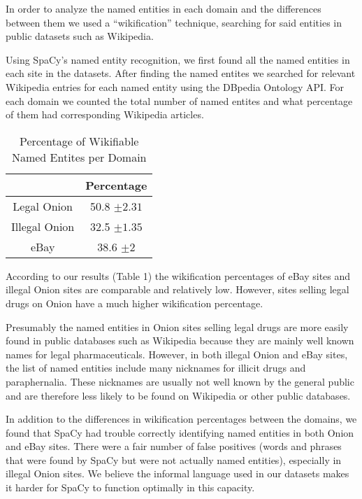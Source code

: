 \documentclass[11pt,a4paper]{article}
\begin{document}
In order to analyze the named entities in each domain and the differences
between them we used a ``wikification'' technique, searching for
said entities in public datasets such as Wikipedia. 

Using SpaCy's named entity recognition, we first found all the named
entities in each site in the datasets. After finding the named entites
we searched for relevant Wikipedia entries for each named entity using
the DBpedia Ontology API. For each domain we counted the total number
of named entites and what percentage of them had corresponding Wikipedia
articles.

\begin{table}

\caption{Percentage of Wikifiable Named Entites per Domain}

\begin{centering}
\begin{tabular}{|c||c|}
\hline 
 & Percentage\tabularnewline
\hline 
\hline 
Legal Onion & 50.8 $\pm2.31$\tabularnewline
\hline 
\hline 
Illegal Onion & 32.5 $\pm1.35$\tabularnewline
\hline 
\hline 
eBay & 38.6 $\pm2$\tabularnewline
\hline 
\end{tabular}
\par\end{centering}
\end{table}
According to our results (Table 1) the wikification percentages of
eBay sites and illegal Onion sites are comparable and relatively low.
However, sites selling legal drugs on Onion have a much higher wikification
percentage.

Presumably the named entities in Onion sites selling legal drugs are
more easily found in public databases such as Wikipedia because they
are mainly well known names for legal pharmaceuticals. However, in
both illegal Onion and eBay sites, the list of named entities include
many nicknames for illicit drugs and paraphernalia. These nicknames
are usually not well known by the general public and are therefore
less likely to be found on Wikipedia or other public databases.

In addition to the differences in wikification percentages between
the domains, we found that SpaCy had trouble correctly identifying
named entities in both Onion and eBay sites. There were a fair number
of false positives (words and phrases that were found by SpaCy but
were not actually named entities), especially in illegal Onion sites.
We believe the informal language used in our datasets makes it harder
for SpaCy to function optimally in this capacity.
\end{document}
